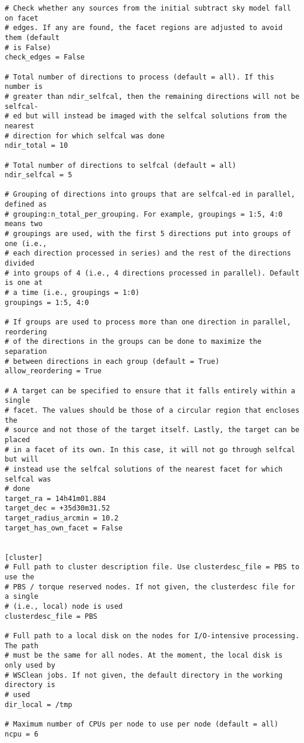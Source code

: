 \documentclass[structabstract]{article}
\begin{document}
\begin{verbatim}
# Check whether any sources from the initial subtract sky model fall on facet
# edges. If any are found, the facet regions are adjusted to avoid them (default
# is False)
check_edges = False

# Total number of directions to process (default = all). If this number is
# greater than ndir_selfcal, then the remaining directions will not be selfcal-
# ed but will instead be imaged with the selfcal solutions from the nearest
# direction for which selfcal was done
ndir_total = 10

# Total number of directions to selfcal (default = all)
ndir_selfcal = 5

# Grouping of directions into groups that are selfcal-ed in parallel, defined as
# grouping:n_total_per_grouping. For example, groupings = 1:5, 4:0 means two
# groupings are used, with the first 5 directions put into groups of one (i.e.,
# each direction processed in series) and the rest of the directions divided
# into groups of 4 (i.e., 4 directions processed in parallel). Default is one at
# a time (i.e., groupings = 1:0)
groupings = 1:5, 4:0

# If groups are used to process more than one direction in parallel, reordering
# of the directions in the groups can be done to maximize the separation
# between directions in each group (default = True)
allow_reordering = True

# A target can be specified to ensure that it falls entirely within a single
# facet. The values should be those of a circular region that encloses the
# source and not those of the target itself. Lastly, the target can be placed
# in a facet of its own. In this case, it will not go through selfcal but will
# instead use the selfcal solutions of the nearest facet for which selfcal was
# done
target_ra = 14h41m01.884
target_dec = +35d30m31.52
target_radius_arcmin = 10.2
target_has_own_facet = False


[cluster]
# Full path to cluster description file. Use clusterdesc_file = PBS to use the
# PBS / torque reserved nodes. If not given, the clusterdesc file for a single
# (i.e., local) node is used
clusterdesc_file = PBS

# Full path to a local disk on the nodes for I/O-intensive processing. The path
# must be the same for all nodes. At the moment, the local disk is only used by
# WSClean jobs. If not given, the default directory in the working directory is
# used
dir_local = /tmp

# Maximum number of CPUs per node to use per node (default = all)
ncpu = 6


\end{verbatim}
\end{document}
